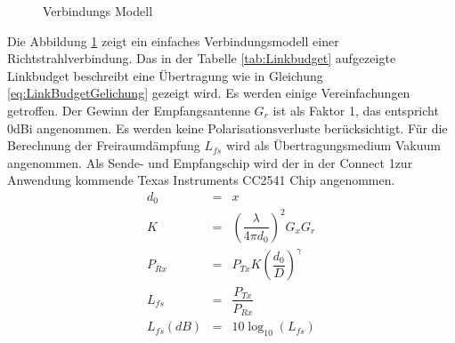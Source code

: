\begin{figure}[h]
\begin{center}
\end{center}
\caption{Verbindungs Modell}
\label{fig:LinkModell}
\end{figure}
Die Abbildung \ref{fig:LinkModell} zeigt ein einfaches Verbindungsmodell einer Richtstrahlverbindung. Das in der Tabelle \ref{tab:Linkbudget} aufgezeigte Linkbudget beschreibt eine Übertragung wie in Gleichung \ref{eq:LinkBudgetGelichung} gezeigt wird. Es werden einige Vereinfachungen getroffen. Der Gewinn der Empfangsantenne $G_{r}$  ist als Faktor 1, das entspricht 0dBi angenommen. Es werden keine Polarisationsverluste berücksichtigt. Für die Berechnung der Freiraumdämpfung $L_{fs}$ wird als Übertragungsmedium Vakuum angenommen. Als Sende- und Empfangschip wird der in der \glqq Connect 1\grqq zur Anwendung kommende Texas Instruments CC2541 Chip angenommen.
\begin{eqnarray}
    	d_{0} 	&=& x \\ \label{eq:d0_LinkBudget}
    K		&=& \left(\dfrac{\lambda}{4\pi d_{0}} \right)^{2}G_{x}G_{r} \\ \label{eq:K_LinkBudget}
    P_{Rx} 	&=& P_{Tx}K \left( \dfrac{d_{0}}{D}\right)^{\gamma} \\ \label{eq:Prx_LinkBudget}
    L_{fs} 	&=& \dfrac{P_{Tx}}{P_{Rx}} \\ \label{eq:Freiraumdaempfung}
    L_{fs}(dB) 	&=& 10\log_{10}(L_{fs}) \label{eq:Freiraumdaempfung_dB}
\end{eqnarray}



